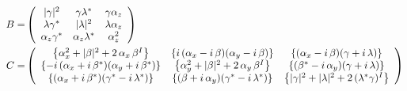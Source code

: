 \documentclass{article}
\begin{document}
\begin{align*}
    B =& \left( \begin{array}{ccc}
         |\gamma|^2& \gamma\lambda^*& \gamma\alpha_z\\
         \lambda\gamma^*& |\lambda|^2& \lambda\alpha_z\\
         \alpha_z\gamma^*& \alpha_z\lambda^*& \alpha_z^2
    \end{array} \right)\\
    C =& \left( \begin{array}{c cc}
         \left\{\alpha_x^2+|\beta|^2+2\,\alpha_x\,\beta^I\right\}&%
         \left\{i\,(\alpha_x-i\,\beta)(\alpha_y-i\,\beta)\right\}&
         \left\{(\alpha_x-i\,\beta)(\gamma+i\,\lambda)\right\}\\
         \left\{-i\,(\alpha_x+i\,\beta^*)(\alpha_y+i\,\beta^*)\right\}&\left\{\alpha_y^2+|\beta|^2+2\,\alpha_y\,\beta^I\right\}&\left\{(\beta^*-i\,\alpha_y)(\gamma+i\,\lambda) \right\}\\
         \left\{(\alpha_x+i\,\beta^*)(\gamma^*-i\,\lambda^*)\right\}& \left\{(\beta+i\,\alpha_y)(\gamma^*-i\,\lambda^*) \right\}& \left\{|\gamma|^2+|\lambda|^2+ 2\, (\lambda^*\gamma)^I \right\}
    \end{array} \right)
\end{align*}
\end{document}
